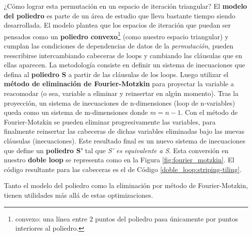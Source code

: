 \documentclass{article}
\begin{document}
¿Cómo lograr esta permutación en un espacio de iteración triangular? El \textbf{modelo del poliedro} es parte
de un área de estudio que lleva bastante tiempo siendo desarrollada. El modelo plantea que los espacios
de iteración que puedan ser pensados como un \textbf{poliedro convexo}\footnote{convexo: una línea entre 2 puntos
del poliedro pasa únicamente por puntos interiores al poliedro.} (como nuestro espacio triangular) y cumplan las condiciones de dependencias
de datos de la \textit{permutación}, pueden reescribirse intercambiando cabeceras de loops y cambiando las cláusulas que en ellas aparecen.
La metodología consiste en
definir un sistema de inecuaciones que defina al \textbf{poliedro S} a partir de las cláusulas de los loops. Luego utilizar
el \textbf{método de eliminación de Fourier-Motzkin} para proyectar la variable a reacomodar (o sea, variable a eliminar y
reinsertar en algún momento). Tras la proyección, un sistema de inecuaciones de n-dimensiones (loop de n-variables)
queda como un sistema de m-dimensiones donde $m=n-1$. Con el método de Fourier-Motzkin se pueden eliminar progresivamente las variables,
para finalmente reinsertar las cabeceras de dichas variables eliminadas bajo las nuevas cláusulas (inecuaciones). Este resultado
final es un nuevo sistema de inecuaciones que define un \textbf{poliedro S'} tal que \textit{S' es equivalente a S}.
Esta conversión en nuestro \textbf{doble loop} se representa como en la Figura \ref{fig:fourier_motzkin}. El código
resultante para las cabeceras es el de Código \ref{doble_loop:striping-tiling}.


Tanto el modelo del poliedro como la eliminación por método de Fourier-Motzkin, tienen utilidades más allá
de estas optimizaciones.
\end{document}
